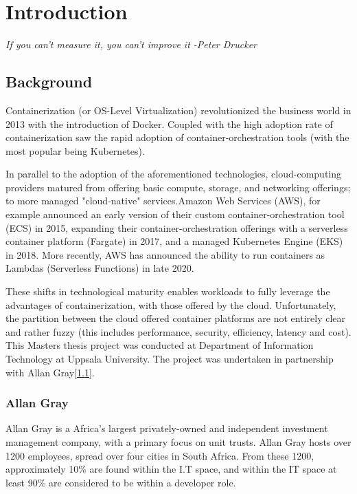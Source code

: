 \part{Introduction}
\label{sec:intro}
\textit{If you can't measure it, you can't improve it -Peter Drucker}

\chapter{Background}
Containerization (or OS-Level Virtualization)\cite{virtualization} revolutionized the business world in 2013 with the introduction of Docker\cite{docker}.
Coupled with the high adoption rate of containerization saw the rapid adoption of container-orchestration tools (with the most popular being Kubernetes\cite{k8s}).

In parallel to the adoption of the aforementioned technologies, cloud-computing providers matured from offering basic compute, storage,
and networking offerings; to more managed "cloud-native" services.Amazon Web Services (AWS),
for example announced an early version of their custom container-orchestration tool (ECS) in 2015\cite{ecs},
expanding their container-orchestration offerings with a serverless container platform (Fargate) in 2017\cite{fargate},
and a managed Kubernetes Engine (EKS) in 2018\cite{eks}.
More recently, AWS has announced the ability to run containers as Lambdas (Serverless Functions) in late 2020\cite{lambda}.

\noindent These shifts in technological maturity enables workloads to fully leverage the advantages of containerization, with those offered by the cloud.
Unfortunately, the partition between the cloud offered container platforms are not entirely clear and rather fuzzy
(this includes performance, security, efficiency, latency and cost).\\

\noindent This Masters thesis project was conducted at Department of Information Technology at Uppsala University.
The project was undertaken in partnership with Allan Gray[\ref{sec:allan_gray}].

\section{Allan Gray}
\label{sec:allan_gray}
Allan Gray\cite{allan_gray} is a Africa's largest privately-owned and independent investment management company, with a primary focus on unit trusts.
Allan Gray hosts over 1200 employees, spread over four cities in South Africa. From these 1200, approximately 10\% are found within the I.T space,
and within the IT space at least 90\% are considered to be within a developer role.

